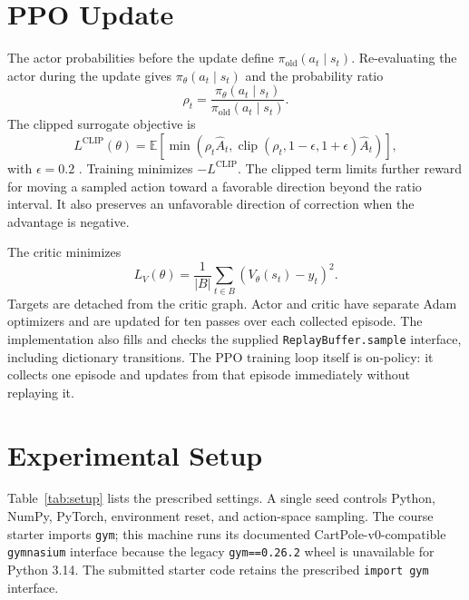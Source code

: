 \documentclass{article}
\begin{document}
\section{PPO Update}\label{sec:ppo}

The actor probabilities before the update define
$\pi_{\mathrm{old}}(a_t\mid s_t)$. Re-evaluating the actor during the update
gives $\pi_{\theta}(a_t\mid s_t)$ and the probability ratio
\begin{equation}\label{eq:ratio}
  \rho_t=
  \frac{\pi_{\theta}(a_t\mid s_t)}
       {\pi_{\mathrm{old}}(a_t\mid s_t)}.
\end{equation}
The clipped surrogate objective is
\begin{equation}\label{eq:clip}
  L^{\mathrm{CLIP}}(\theta)=
  \mathbb E\left[
  \min\left(\rho_t\hat A_t,
  \operatorname{clip}(\rho_t,1-\epsilon,1+\epsilon)\hat A_t
  \right)\right],
\end{equation}
with $\epsilon=0.2$ \citep{schulman2017proximal}. Training minimizes
$-L^{\mathrm{CLIP}}$. The clipped term limits further reward for moving a
sampled action toward a favorable direction beyond the ratio interval. It
also preserves an unfavorable direction of correction when the advantage is
negative.

The critic minimizes
\begin{equation}\label{eq:critic}
  L_V(\theta)=\frac{1}{|B|}\sum_{t\in B}
  \left(V_\theta(s_t)-y_t\right)^2.
\end{equation}
Targets are detached from the critic graph. Actor and critic have separate
Adam optimizers and are updated for ten passes over each collected episode.
The implementation also fills and checks the supplied
\texttt{ReplayBuffer.sample} interface, including dictionary transitions. The
PPO training loop itself is on-policy: it collects one episode and updates
from that episode immediately without replaying it.

\section{Experimental Setup}\label{sec:setup}

Table~\ref{tab:setup} lists the prescribed settings. A single seed controls
Python, NumPy, PyTorch, environment reset, and action-space sampling. The
course starter imports \texttt{gym}; this machine runs its documented
CartPole-v0-compatible \texttt{gymnasium} interface because the legacy
\texttt{gym==0.26.2} wheel is unavailable for Python 3.14. The submitted
starter code retains the prescribed \texttt{import gym} interface.
\end{document}
